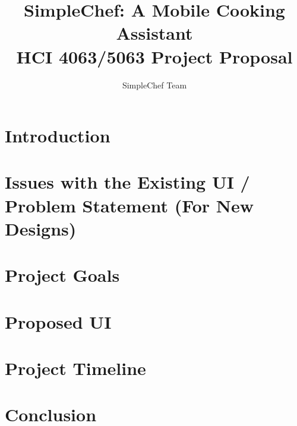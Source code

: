 \documentclass[conference]{IEEEtran}
\title{SimpleChef: A Mobile Cooking Assistant \\ HCI 4063/5063 Project Proposal}
\author{SimpleChef Team}
\begin{document}
\maketitle


\section{Introduction}



\section{Issues with the Existing UI / Problem Statement (For New Designs)}

\section{Project Goals}


\section{Proposed UI}



\section{Project Timeline}


\section{Conclusion}

\nocite{*} %

\end{document}
